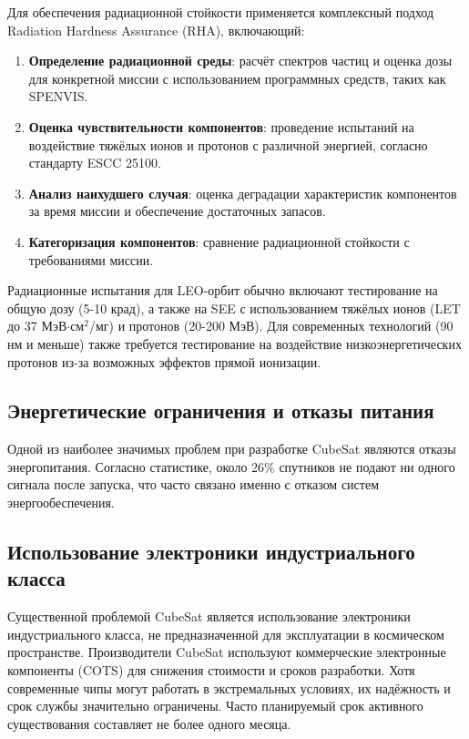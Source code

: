 Для обеспечения радиационной стойкости применяется комплексный подход Radiation Hardness Assurance (RHA), включающий:

\begin{enumerate}
	\item \textbf{Определение радиационной среды}: расчёт спектров частиц и оценка дозы для конкретной миссии с использованием программных средств, таких как SPENVIS\cite{nasa_rha_standard}.

	\item \textbf{Оценка чувствительности компонентов}: проведение испытаний на воздействие тяжёлых ионов и протонов с различной энергией, согласно стандарту ESCC 25100\cite{escc_see_test}.

	\item \textbf{Анализ наихудшего случая}: оценка деградации характеристик компонентов за время миссии и обеспечение достаточных запасов\cite{nasa_rha_standard}.

	\item \textbf{Категоризация компонентов}: сравнение радиационной стойкости с требованиями миссии\cite{rha_space_systems}.
\end{enumerate}

Радиационные испытания для LEO-орбит обычно включают тестирование на общую дозу (5-10 крад), а также на SEE с использованием тяжёлых ионов (LET до 37 МэВ$\cdot$см$^2$/мг) и протонов (20-200 МэВ)\cite{proton_guide}. Для современных технологий (90 нм и меньше) также требуется тестирование на воздействие низкоэнергетических протонов из-за возможных эффектов прямой ионизации\cite{escc_see_test}.



\subsection{Энергетические ограничения и отказы питания}
Одной из наиболее значимых проблем при разработке CubeSat являются отказы энергопитания. Согласно статистике, около 26\% спутников не подают ни одного сигнала после запуска, что часто связано именно с отказом систем энергообеспечения\cite{kulu2020nanosats}.

\subsection{Использование электроники индустриального класса}
Существенной проблемой CubeSat является использование электроники индустриального класса, не предназначенной для эксплуатации в космическом пространстве\cite{scholz2015cots}. Производители CubeSat используют коммерческие электронные компоненты (COTS) для снижения стоимости и сроков разработки. Хотя современные чипы могут работать в экстремальных условиях, их надёжность и срок службы значительно ограничены. Часто планируемый срок активного существования составляет не более одного месяца\cite{scholz2015cots}.

